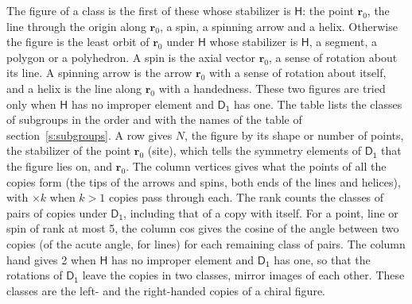 \documentclass[10pt,a4paper]{article}
\numberwithin{equation}{section}
\newcommand{\grp}[1]{\mathsf{#1}}
\newcommand{\pointr}{\mathbf{r}}
\begin{document}
\leavevmode\label{n:head.figure}The figure of a class is the first of these whose stabilizer is $\grp{H}$: the point $\pointr_0$, the line through the origin along $\pointr_0$, a spin, a spinning arrow and a helix. Otherwise the figure is the least orbit of $\pointr_0$ under $\grp{H}$ whose stabilizer is $\grp{H}$, a segment, a polygon or a polyhedron. A spin is the axial vector $\pointr_0$, a sense of rotation about its line. A spinning arrow is the arrow $\pointr_0$ with a sense of rotation about itself, and a helix is the line along $\pointr_0$ with a handedness. These two figures are tried only when $\grp{H}$ has no improper element and $\grp{D_{1}}$ has one. The table lists the classes of subgroups in the order and with the names of the table of section~\ref{s:subgroups}. \label{n:head.site}A row gives $N$, the figure by its shape or number of points, the stabilizer of the point $\pointr_0$ (site), which tells the symmetry elements of $\grp{D_{1}}$ that the figure lies on, and $\pointr_0$. \label{n:head.vertices}The column vertices gives what the points of all the copies form (the tips of the arrows and spins, both ends of the lines and helices), with ${\times}k$ when $k > 1$ copies pass through each. \label{n:head.rank}The rank counts the classes of pairs of copies under $\grp{D_{1}}$, including that of a copy with itself. \label{n:head.cos}For a point, line or spin of rank at most 5, the column cos gives the cosine of the angle between two copies (of the acute angle, for lines) for each remaining class of pairs. \label{n:head.hand}The column hand gives 2 when $\grp{H}$ has no improper element and $\grp{D_{1}}$ has one, so that the rotations of $\grp{D_{1}}$ leave the copies in two classes, mirror images of each other. These classes are the left- and the right-handed copies of a chiral figure.
\end{document}
